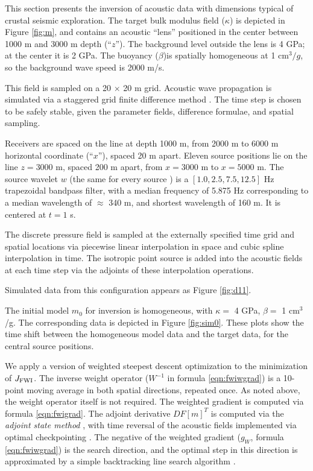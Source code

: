 
This section presents the inversion of acoustic data with dimensions
typical of crustal seismic exploration. The target bulk modulus field ($\kappa$)
is depicted in Figure \ref{fig:m}, and contains an acoustic ``lens''
positioned in the center between 1000 m and 3000 m depth
(``$z$''). The background level outside the lens is 4 GPa; at the
center it is 2 GPa. The
buoyancy ($\beta$)is spatially homogeneous at 1 cm$^3/g$, so the background
wave speed is 2000 m/s.


This field is sampled on a 20 $\times$ 20 m grid. Acoustic wave
propagation is simulated via a staggered grid finite difference method
\cite[]{vir86,lev88,Cohen:01}. The time
step is chosen to be safely stable, given the parameter fields,
difference formulae, and
spatial sampling. 

Receivers are spaced on the line at depth 1000 m, from 2000 m to 6000
m horizontal coordinate (``$x$''), spaced 20 m apart. Eleven source
positions lie on the line $z=3000$ m, spaced 200 m apart, from
$x=3000$ m to $x = 5000$ m. The source wavelet $w$ (the same for every
source ) is a $[1.0, 2.5, 7.5, 12.5]$ Hz trapezoidal bandpass filter,
with a median frequency of 5.875 Hz corresponding to a median wavelength of
$\approx$ 340 m, and shortest wavelength of 160 m. It is centered at
$t=1$ s.

The discrete pressure field is
sampled at the externally specified time grid and spatial locations
via piecewise linear interpolation in space and cubic spline
interpolation in time. The isotropic point source is added
into the acoustic fields at each time step via the adjoints of these
interpolation operations.

Simulated data from this configuration appears as Figure \ref{fig:d11}.

The initial model $m_0$ for inversion is homogeneous, with $\kappa = $ 4 GPa,
$\beta = $ 1 cm$^3$/g. The corresponding data is depicted in Figure \ref{fig:sim0}.
These plots show the time shift between the homogeneous model data and
the target data, for the central source positions.


We apply a version of weighted steepest descent optimization to the
minimization of $J_{\rm FWI}$. The inverse weight operator ($W^{-1}$
in formula \ref{eqn:fwiwgrad}) is a
10-point moving average in both spatial directions, repeated once. As
noted above, the weight operator itself is not required. The weighted
gradient is computed via formula \ref{eqn:fwigrad}. The adjoint
derivative $DF[m]^T$ is computed via the {\em adjoint state method}
\cite[]{Chavent:74,GauTarVir:86}, with time reversal of the acoustic fields
implemented via optimal checkpointing
\cite[]{Griewank:92,Griewank:book,Symes:06a-pub}. The negative of the weighted
gradient ($g_W$, formula \ref{eqn:fwiwgrad}) is the search direction,
and the optimal step in this direction is approximated by a simple
backtracking line search algorithm \cite[]{NocedalWright}.

